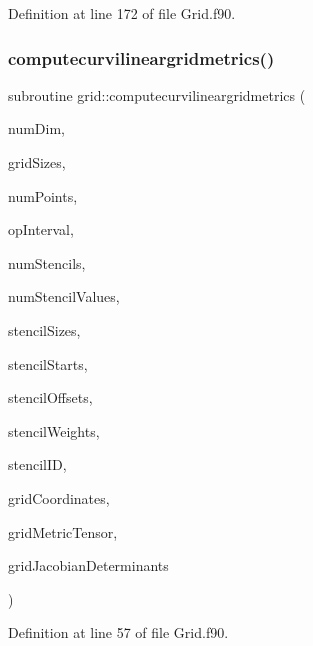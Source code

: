 Definition at line 172 of file Grid.\+f90.

\hypertarget{namespacegrid_a7424cadee63bb7574ca7cf11cf49714b}{}\label{namespacegrid_a7424cadee63bb7574ca7cf11cf49714b} 
\subsubsection{\texorpdfstring{computecurvilineargridmetrics()}{computecurvilineargridmetrics()}}
{\footnotesize\ttfamily subroutine grid\+::computecurvilineargridmetrics (\begin{DoxyParamCaption}\item[{integer(kind=4), intent(in)}]{num\+Dim,  }\item[{integer(kind=8), dimension(numdim), intent(in)}]{grid\+Sizes,  }\item[{integer(kind=8), intent(in)}]{num\+Points,  }\item[{integer(kind=8), dimension(2$\ast$numdim), intent(in)}]{op\+Interval,  }\item[{integer(kind=4), intent(in)}]{num\+Stencils,  }\item[{integer(kind=4), intent(in)}]{num\+Stencil\+Values,  }\item[{integer(kind=4), dimension(numstencils), intent(in)}]{stencil\+Sizes,  }\item[{integer(kind=4), dimension(numstencils), intent(in)}]{stencil\+Starts,  }\item[{integer(kind=4), dimension(numstencilvalues), intent(in)}]{stencil\+Offsets,  }\item[{real(kind=8), dimension(numstencilvalues), intent(in)}]{stencil\+Weights,  }\item[{integer(kind=4), dimension(numdim$\ast$numpoints), intent(in), target}]{stencil\+ID,  }\item[{real(kind=8), dimension(numdim$\ast$numpoints), intent(in), target}]{grid\+Coordinates,  }\item[{real(kind=8), dimension(numdim$\ast$numdim$\ast$numpoints), intent(inout), target}]{grid\+Metric\+Tensor,  }\item[{real(kind=8), dimension(2$\ast$numpoints), intent(inout), target}]{grid\+Jacobian\+Determinants }\end{DoxyParamCaption})}



Definition at line 57 of file Grid.\+f90.



